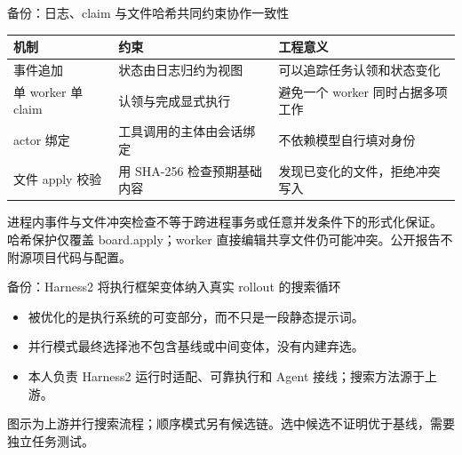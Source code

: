 \documentclass[aspectratio=169,10pt]{beamer}
\newcommand{\src}[1]{\vfill{\fontsize{6.7}{8}\selectfont\color{Muted}#1}\par}
\newcommand{\warn}[1]{\textcolor{Amber}{#1}}
\begin{document}
\begin{frame}{备份：日志、claim 与文件哈希共同约束协作一致性}
\renewcommand{\arraystretch}{1.65}
\begin{tabularx}{\textwidth}{@{}lYY@{}}
\toprule 机制 & 约束 & 工程意义 \\
\midrule
事件追加 & 状态由日志归约为视图 & 可以追踪任务认领和状态变化 \\
单 worker 单 claim & 认领与完成显式执行 & 避免一个 worker 同时占据多项工作 \\
actor 绑定 & 工具调用的主体由会话绑定 & 不依赖模型自行填对身份 \\
文件 apply 校验 & 用 SHA-256 检查预期基础内容 & 发现已变化的文件，拒绝冲突写入 \\
\bottomrule
\end{tabularx}
\medskip
\warn{进程内事件与文件冲突检查不等于跨进程事务或任意并发条件下的形式化保证。}
\src{哈希保护仅覆盖 board.apply；worker 直接编辑共享文件仍可能冲突。公开报告不附源项目代码与配置。}
\end{frame}

\begin{frame}{备份：Harness2 将执行框架变体纳入真实 rollout 的搜索循环}
\begin{center}
\end{center}
\medskip
\begin{itemize}
\item 被优化的是执行系统的可变部分，而不只是一段静态提示词。
\item 并行模式最终选择池不包含基线或中间变体，没有内建弃选。
\item 本人负责 Harness2 运行时适配、可靠执行和 Agent 接线；搜索方法源于上游。
\end{itemize}
\src{图示为上游并行搜索流程；顺序模式另有候选链。选中候选不证明优于基线，需要独立任务测试。}
\end{frame}
\end{document}
